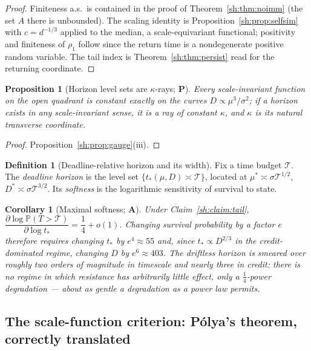 \documentclass[11pt]{article}
\numberwithin{equation}{section}
\theoremstyle{plain}
\newtheorem{proposition}[theorem]{Proposition}
\newtheorem{corollary}[theorem]{Corollary}
\theoremstyle{definition}
\newtheorem{definition}[theorem]{Definition}
\theoremstyle{remark}
\newcommand{\PP}{\mathbb{P}}
\begin{document}
\begin{proof}
Finiteness a.s.\ is contained in the proof of
Theorem~\ref{sh:thm:noimm} (the set $A$ there is unbounded). The scaling
identity is Proposition~\ref{sh:prop:selfsim} with $c=d^{-1/3}$ applied to
the median, a scale-equivariant functional; positivity and finiteness of
$\rho_1$ follow since the return time is a nondegenerate positive random
variable. The tail index is Theorem~\ref{sh:thm:persist} read for the
returning coordinate.
\end{proof}

\begin{proposition}[Horizon level sets are $\kappa$-rays; \textbf{P}]
\label{sh:prop:rays}
Every scale-invariant function on the open quadrant is constant exactly on
the curves $D\propto\mu^3/\sigma^2$; if a horizon exists in any
scale-invariant sense, it is a ray of constant $\kappa$, and $\kappa$ is
its natural transverse coordinate.
\end{proposition}

\begin{proof}
Proposition~\ref{sh:prop:gauge}(iii).
\end{proof}

\begin{definition}[Deadline-relative horizon and its width]
\label{sh:def:deadline}
Fix a time budget $\mathcal T$. The \emph{deadline horizon} is the level
set $\{t_*(\mu,D)\asymp\mathcal T\}$, located at
$\mu^*\asymp\sigma\mathcal T^{1/2}$, $D^*\asymp\sigma\mathcal T^{3/2}$.
Its \emph{softness} is the logarithmic sensitivity of survival to state.
\end{definition}

\begin{corollary}[Maximal softness; \textbf{A}]\label{sh:cor:soft}
Under Claim~\ref{sh:claim:tail},
$\dfrac{\partial\log\PP(T>\mathcal T)}{\partial\log t_*}=\dfrac14+o(1)$.
Changing survival probability by a factor $e$ therefore requires changing
$t_*$ by $e^4\approx55$ and, since $t_*\propto D^{2/3}$ in the
credit-dominated regime, changing $D$ by $e^6\approx403$. The driftless
horizon is smeared over roughly two orders of magnitude in timescale and
nearly three in credit: there is no regime in which resistance has
arbitrarily little effect, only a $\tfrac14$-power degradation --- about as
gentle a degradation as a power law permits.
\end{corollary}

\subsection{The scale-function criterion: P\'olya's theorem, correctly
translated}\label{sh:subsub:scale}
\end{document}
